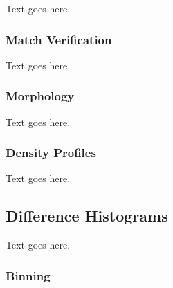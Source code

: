 Text goes here.



\subsubsection{Match Verification}
\label{subsubsec:analysis--halo_comparison--match_verification}


Text goes here.



\subsubsection{Morphology}
\label{subsubsec:analysis--halo_comparison--morphology}


Text goes here.



\subsubsection{Density Profiles}
\label{subsubsec:analysis--halo_comparison--density_profiles}


Text goes here.




\subsection{Difference Histograms}
\label{subsec:analysis--difference_histograms}


Text goes here.



\subsubsection{Binning}
\label{subsubsec:analysis--difference_histograms--binning}



